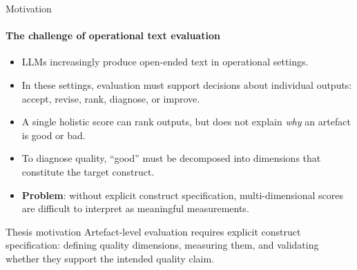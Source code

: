 




\begin{frame}{Motivation}
\framesubtitle{The challenge of operational text evaluation}

\begin{itemize}
    \item LLMs increasingly produce open-ended text in operational settings.

    \item In these settings, evaluation must support decisions about individual outputs: accept, revise, rank, diagnose, or improve.

    \item A single holistic score can rank outputs, but does not explain \textit{why} an artefact is good or bad.

    \item To diagnose quality, ``good'' must be decomposed into dimensions that constitute the target construct.

    \item \textbf{Problem}: without explicit construct specification, multi-dimensional scores are difficult to interpret as meaningful measurements.
\end{itemize}

\vspace{0.30cm}

\begin{block}{Thesis motivation}
    Artefact-level evaluation requires explicit construct specification: defining quality dimensions, measuring them, and validating whether they support the intended quality claim.
\end{block}

\end{frame}